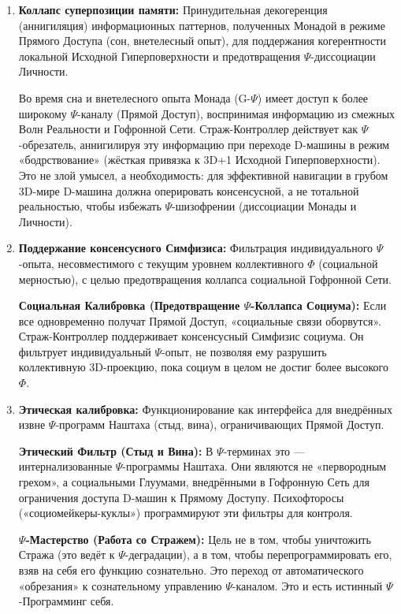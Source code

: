 \documentclass[a4paper,12pt]{article}
\begin{document}
\begin{enumerate}
	\item \textbf{Коллапс суперпозиции памяти:} Принудительная декогеренция (аннигиляция) информационных паттернов, полученных Монадой в режиме Прямого Доступа (сон, внетелесный опыт), для поддержания когерентности локальной Исходной Гиперповерхности и предотвращения $\Psi$-диссоциации Личности.
	
	Во время сна и внетелесного опыта Монада (G-$\Psi$) имеет доступ к более широкому $\Psi$-каналу (Прямой Доступ), воспринимая информацию из смежных Волн Реальности и Гофронной Сети. Страж-Контроллер действует как $\Psi$-обрезатель, аннигилируя эту информацию при переходе D-машины в режим «бодрствование» (жёсткая привязка к 3D+1 Исходной Гиперповерхности). Это не злой умысел, а необходимость: для эффективной навигации в грубом 3D-мире D-машина должна оперировать консенсусной, а не тотальной реальностью, чтобы избежать $\Psi$-шизофрении (диссоциации Монады и Личности).
	
	\item \textbf{Поддержание консенсусного Симфизиса:} Фильтрация индивидуального $\Psi$-опыта, несовместимого с текущим уровнем коллективного $\Phi$ (социальной мерностью), с целью предотвращения коллапса социальной Гофронной Сети.
	
	\textbf{Социальная Калибровка (Предотвращение $\Psi$-Коллапса Социума):} Если все одновременно получат Прямой Доступ, «социальные связи оборвутся». Страж-Контроллер поддерживает консенсусный Симфизис социума. Он фильтрует индивидуальный $\Psi$-опыт, не позволяя ему разрушить коллективную 3D-проекцию, пока социум в целом не достиг более высокого $\Phi$.
	
	\item \textbf{Этическая калибровка:} Функционирование как интерфейса для внедрённых извне $\Psi$-программ Наштаха (стыд, вина), ограничивающих Прямой Доступ.
	
	\textbf{Этический Фильтр (Стыд и Вина):} В $\Psi$-терминах это — интернализованные $\Psi$-программы Наштаха. Они являются не «первородным грехом», а социальными Глуумами, внедрёнными в Гофронную Сеть для ограничения доступа D-машин к Прямому Доступу. Психофторосы («социомейкеры-куклы») программируют эти фильтры для контроля.
	
	\textbf{$\Psi$-Мастерство (Работа со Стражем):} Цель не в том, чтобы уничтожить Стража (это ведёт к $\Psi$-деградации), а в том, чтобы перепрограммировать его, взяв на себя его функцию сознательно. Это переход от автоматического «обрезания» к сознательному управлению $\Psi$-каналом. Это и есть истинный $\Psi$-Программинг себя.
\end{enumerate}
\end{document}
